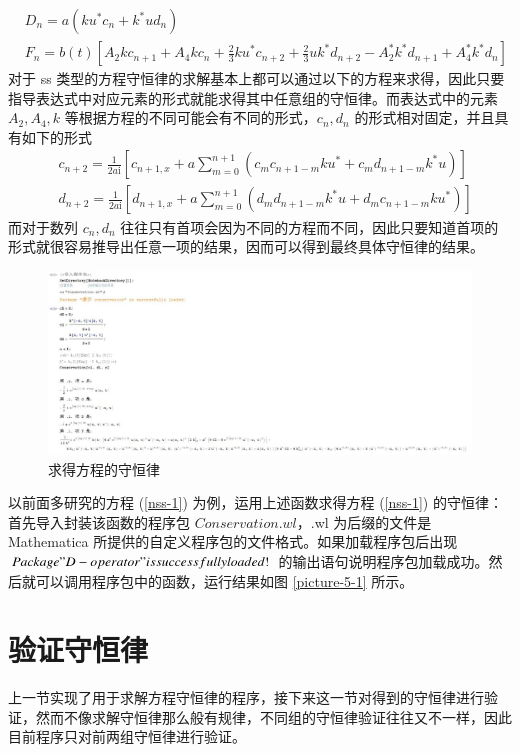 \begin{align}
  & D_{n} = a(ku^{*}c_{n} + k^{*}ud_{n}) \\
  & F_{n} = b(t)\left[A_{2}kc_{n+1} + A_{4}kc_{n} + \frac{2}{3}ku^{*}c_{n+2} + \frac{2}{3}uk^{*}d_{n+2} - A_{2}^{*}k^{*}d_{n+1} + A_{4}^{*}k^{*}d_{n}\right]
\end{align}
对于 ss 类型的方程守恒律的求解基本上都可以通过以下的方程来求得，因此只要指导表达式中对应元素的形式就能求得其中任意组的守恒律。而表达式中的元素 $A_2, A_4, k$ 等根据方程的不同可能会有不同的形式，$c_n, d_n$ 的形式相对固定，并且具有如下的形式
\begin{align}
  & c_{n+2} = \frac{1}{2a\mathrm{i}} \left[c_{n+1,x} + a\sum_{m=0}^{n+1}(c_{m}c_{n+1-m}ku^{*} + c_{m}d_{n+1-m}k^{*}u)\right] \\
  & d_{n+2} = \frac{1}{2a\mathrm{i}} \left[ d_{n+1,x} + a\sum_{m=0}^{n+1}(d_{m}d_{n+1-m}k^{*}u + d_{m}c_{n+1-m}ku^{*}) \right]
\end{align}
而对于数列 $c_n, d_n$ 往往只有首项会因为不同的方程而不同，因此只要知道首项的形式就很容易推导出任意一项的结果，因而可以得到最终具体守恒律的结果。

\begin{figure}[!htp]
\centering
\includegraphics[width=\linewidth]{getConservation.jpg}
\caption{求得方程的守恒律}
\label{picture-5-2}
\end{figure}

以前面多研究的方程 (\ref{nss-1}) 为例，运用上述函数求得方程 (\ref{nss-1}) 的守恒律：首先导入封装该函数的程序包 $Conservation.wl$，.wl 为后缀的文件是 Mathematica 所提供的自定义程序包的文件格式。如果加载程序包后出现 $Package "D-operator" is successfully loaded!$ 的输出语句说明程序包加载成功。然后就可以调用程序包中的函数，运行结果如图 \ref{picture-5-1} 所示。


\section{验证守恒律}
上一节实现了用于求解方程守恒律的程序，接下来这一节对得到的守恒律进行验证，然而不像求解守恒律那么般有规律，不同组的守恒律验证往往又不一样，因此目前程序只对前两组守恒律进行验证。

